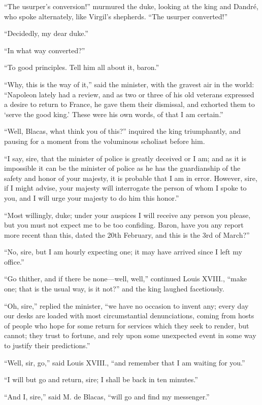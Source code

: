 “The usurper’s conversion!” murmured the duke, looking at the king and
Dandré, who spoke alternately, like Virgil’s shepherds. “The usurper
converted!”

“Decidedly, my dear duke.”

“In what way converted?”

“To good principles. Tell him all about it, baron.”

“Why, this is the way of it,” said the minister, with the gravest air
in the world: “Napoleon lately had a review, and as two or three of his
old veterans expressed a desire to return to France, he gave them their
dismissal, and exhorted them to ‘serve the good king.’ These were his
own words, of that I am certain.”

“Well, Blacas, what think you of this?” inquired the king triumphantly,
and pausing for a moment from the voluminous scholiast before him.

“I say, sire, that the minister of police is greatly deceived or I am;
and as it is impossible it can be the minister of police as he has the
guardianship of the safety and honor of your majesty, it is probable
that I am in error. However, sire, if I might advise, your majesty will
interrogate the person of whom I spoke to you, and I will urge your
majesty to do him this honor.”

“Most willingly, duke; under your auspices I will receive any person
you please, but you must not expect me to be too confiding. Baron, have
you any report more recent than this, dated the 20th February, and this
is the 3rd of March?”

“No, sire, but I am hourly expecting one; it may have arrived since I
left my office.”

“Go thither, and if there be none—well, well,” continued Louis XVIII.,
“make one; that is the usual way, is it not?” and the king laughed
facetiously.

“Oh, sire,” replied the minister, “we have no occasion to invent any;
every day our desks are loaded with most circumstantial denunciations,
coming from hosts of people who hope for some return for services which
they seek to render, but cannot; they trust to fortune, and rely upon
some unexpected event in some way to justify their predictions.”

“Well, sir, go,” said Louis XVIII., “and remember that I am waiting for
you.”

“I will but go and return, sire; I shall be back in ten minutes.”

“And I, sire,” said M. de Blacas, “will go and find my messenger.”

